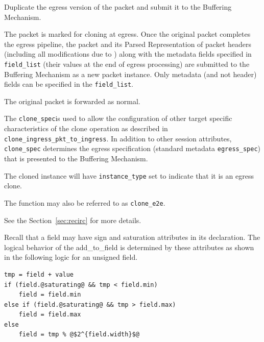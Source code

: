\documentclass[12pt]{article}
\begin{document}
{ %
Duplicate the egress version of the packet and submit it to the Buffering 
Mechanism.
}
{ %
}
{ %
The packet is marked for cloning at egress. Once the original packet completes 
the egress pipeline, the packet and its Parsed Representation of packet headers 
(including all modifications due to \matchaction) along with the metadata 
fields specified in \texttt{field_list} (their values at the end of egress processing) are submitted to the Buffering Mechanism as 
a new packet instance. Only metadata (and not header) fields can be specified in the \texttt{field_list}.

The original packet is forwarded as normal.

The \texttt{clone_spec}is used to allow the configuration of other target specific 
characteristics of the clone operation as described in \texttt{clone_ingress_pkt_to_ingress}. 
In addition to other session attributes, \texttt{clone_spec} determines the egress 
specification (standard metadata \texttt{egress_spec}) that is presented to the 
Buffering Mechanism.

The cloned instance will have \texttt{instance_type} set to indicate that it is an 
egress clone. 

The function may also be referred to as \texttt{clone_e2e}.

See the Section~\ref{sec:recirc} for more details.
}



Recall that a field may have sign and saturation attributes in its declaration. 
The logical behavior of the add_to_field is determined by these attributes 
as shown in the following logic for an unsigned field.

\begin{lstlisting}[keywords={},frame=single,escapechar=\@]
tmp = field + value
if (field.@saturating@ && tmp < field.min)
    field = field.min
else if (field.@saturating@ && tmp > field.max)
    field = field.max
else
    field = tmp % @$2^{field.width}$@
\end{lstlisting}
\end{document}
